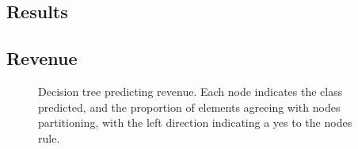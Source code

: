 \documentclass[review,12pt,authoryear]{elsarticle}
\begin{document}
\begin{linenumbers}
\section{Results}


\subsection{Revenue}

\begin{figure} 
  \caption{Decision tree predicting revenue. Each node indicates the class predicted, and the proportion of elements agreeing with nodes partitioning, with the left direction indicating a yes to the nodes rule.}\label{fig:revenue_tree}
 \end{figure}
 

\end{linenumbers}
\end{document}
